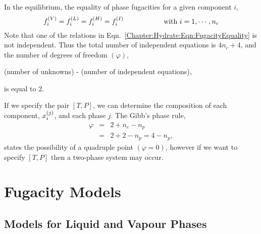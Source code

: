 In the equilibrium, the equality of phase fugacities for a given component $i$,
   \begin{equation}
      \mfr[f]{i}{V} = \mfr[f]{i}{L} = \mfr[f]{i}{H} = \mfr[f]{i}{I} \hspace{2cm}\text{with } i=1,\cdots,n_{c} \label{Chapter:Hydrate:Eqn:FugacityEquality}
   \end{equation}
Note that one of the relations in Eqn.~\ref{Chapter:Hydrate:Eqn:FugacityEquality} is not independent. Thus the total number of independent equations is $4n_{c}+4$, and the number of degrees of freedom $\left(\varphi\right)$, \ie   
   \begin{center} 
      (number of unknowns) - (number of independent equations),
   \end{center}
is equal to $2$.

If we specify the pair $\left[T,P\right]$, we can determine the composition of each component, $\mfr[x]{i}{j}$, and each phase $j$. The Gibb's phase rule,
  \begin{eqnarray}
     \varphi &=& 2 + n_{c} - n_{p} \\ \nonumber
             &=& 2 + 2 - n_{p} = 4 - n_{p},
  \end{eqnarray}
states the possibility of a quadruple point $\left(\varphi=0\right)$, however if we want to specify $\left[T,P\right]$ then a two-phase system may occur.



\section{Fugacity Models}\label{Chapter:Hydrate:Section:FugacityModels}

\subsection{Models for Liquid and Vapour Phases}\label{Chapter:Hydrate:Section:FugacityModels:Section:L_V}

